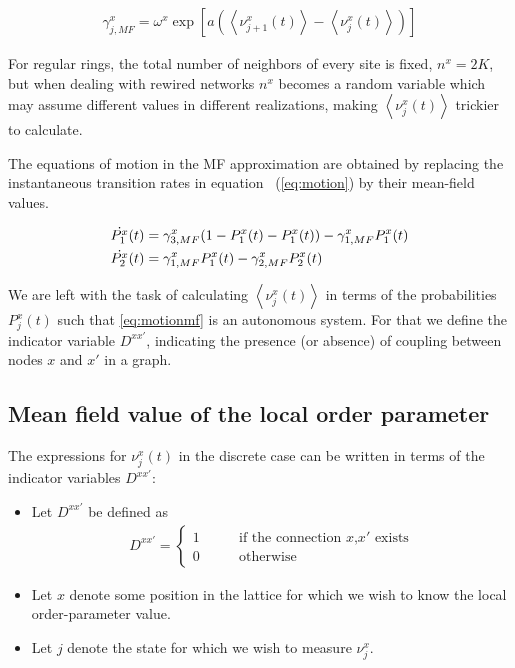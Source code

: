\begin{align}
  \gamma^x_{j,MF} = \omega^x \exp \left[ a \left( \left< \nu^x_{j+1}(t) \right> - \left< \nu^x_j(t) \right> \right) \right]
  \label{gammaMF}
\end{align}

For regular rings, the total number of neighbors of every site is fixed, $n^x= 2K$, but when dealing with rewired networks $n^x$
becomes a random variable which may assume different values in different realizations, making $\left<\nu^x_j(t)\right>$ trickier to
calculate.

The equations of motion in the MF approximation are obtained by replacing the instantaneous transition rates in equation~
(\ref{eq:motion}) by their mean-field values.

\begin{align}
  \dot{P_1^x}(t) &= \gamma^x_{3,MF} (1-P_1^x(t)-P_1^x(t)) - \gamma^x_{1,MF} P_1^x(t) \notag \\
  \dot{P_2^x}(t) &= \gamma^x_{1,MF}  P_1^x(t) - \gamma^x_{2,MF} P_2^x(t)
  \label{eq:motionmf}
\end{align}

We are left with the task of calculating $\left<\nu^x_j(t)\right>$ in terms of the probabilities $P^x_j(t)$ such that \ref{eq:motionmf}
is an autonomous system. For that we define the indicator variable $D^{xx'}$, indicating the presence (or absence) of coupling between
nodes $x$ and $x'$ in a graph.

\subsection{Mean field value of the local order parameter}

The expressions for $\nu^x_j(t)$ in the discrete case can be written in terms of the indicator variables $D^{xx'}$:

\begin{itemize}
  \item Let $D^{xx'}$ be defined as
  \begin{align}
  D^{xx'} = 
    \begin{cases}
    1 \qquad &\text{if the connection $x$,$x'$ exists}\\
    0 \qquad &\text{otherwise}
    \end{cases}
  \end{align}
  \item Let $x$ denote some position in the lattice for which we wish to know the local order-parameter value.
  \item Let $j$ denote the state for which we wish to measure $\nu^x_j$.
\end{itemize}

